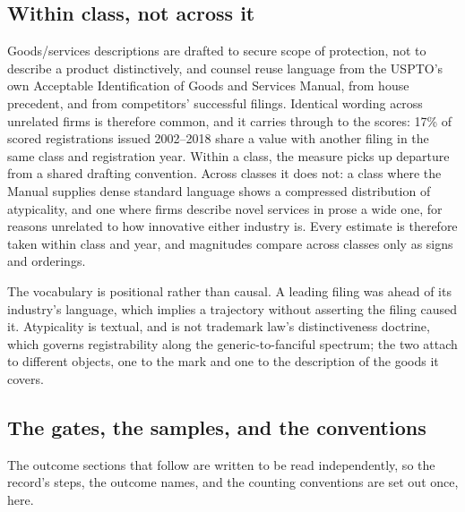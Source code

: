 \subsection{Within class, not across it}

Goods/services descriptions are drafted to secure scope of protection, not to
describe a product distinctively, and counsel reuse language from the USPTO's
own Acceptable Identification of Goods and Services Manual, from house
precedent, and from competitors' successful filings. Identical wording across
unrelated firms is therefore common, and it carries through to the scores:
17\% of scored registrations issued 2002--2018 share a value with another
filing in the same class and registration year. Within a class, the measure picks up departure from a shared
drafting convention. Across classes it does not: a class where the Manual
supplies dense standard language shows a compressed distribution of
atypicality, and one where firms describe novel services in prose a wide one,
for reasons unrelated to how innovative either industry is. Every estimate is
therefore taken within class and year, and magnitudes compare across classes
only as signs and orderings.

The vocabulary is positional rather than causal. A leading filing was ahead of
its industry's language, which implies a trajectory without asserting the
filing caused it. Atypicality is textual, and is not trademark law's
distinctiveness doctrine, which governs registrability along the
generic-to-fanciful spectrum; the two attach to different objects, one to the
mark and one to the description of the goods it covers.

\subsection{The gates, the samples, and the conventions}\label{sec:gates}

The outcome sections that follow are written to be read independently, so
the record's steps, the outcome names, and the counting conventions are
set out once, here.

